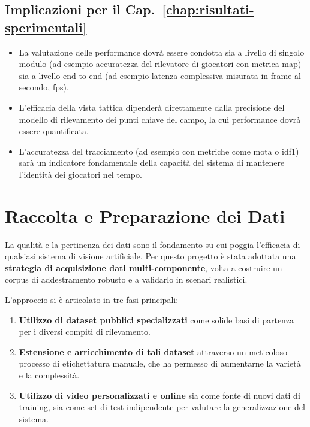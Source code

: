 \documentclass[12pt,a4paper,openright,twoside]{book}
\begin{document}
\subsection*{Implicazioni per il Cap.~\ref{chap:risultati-sperimentali}}
\begin{itemize}
  \item La valutazione delle performance dovrà essere condotta sia 
  a livello di singolo modulo (ad esempio accuratezza del rilevatore 
  di giocatori con metrica \ac{map}) sia a livello end-to-end 
  (ad esempio latenza complessiva misurata in frame al secondo, \ac{fps}).
  \item L'efficacia della vista tattica dipenderà direttamente 
  dalla precisione del modello di rilevamento dei punti chiave del 
  campo, la cui performance dovrà essere quantificata.
  \item L'accuratezza del tracciamento (ad esempio con metriche 
  come \ac{mota} o \ac{idf1}) sarà un indicatore fondamentale della 
  capacità del sistema di mantenere l'identità dei giocatori nel tempo.
\end{itemize}



\section{Raccolta e Preparazione dei Dati}
\label{sec:raccolta-dati}

La qualità e la pertinenza dei dati sono il fondamento su cui poggia l'efficacia di qualsiasi sistema di visione artificiale. Per questo progetto è stata adottata una \textbf{strategia di acquisizione dati multi-componente}, volta a costruire un corpus di addestramento robusto e a validarlo in scenari realistici. 

L'approccio si è articolato in tre fasi principali:
\begin{enumerate}
  \item \textbf{Utilizzo di dataset pubblici specializzati} 
  come solide basi di partenza per i diversi compiti di rilevamento.
  \item \textbf{Estensione e arricchimento di tali dataset} 
  attraverso un meticoloso processo di etichettatura manuale, 
  che ha permesso di aumentarne la varietà e la complessità.
  \item \textbf{Utilizzo di video personalizzati e online} 
  sia come fonte di nuovi dati di training, sia come set di 
  test indipendente per valutare la generalizzazione del sistema.
\end{enumerate}
\end{document}
